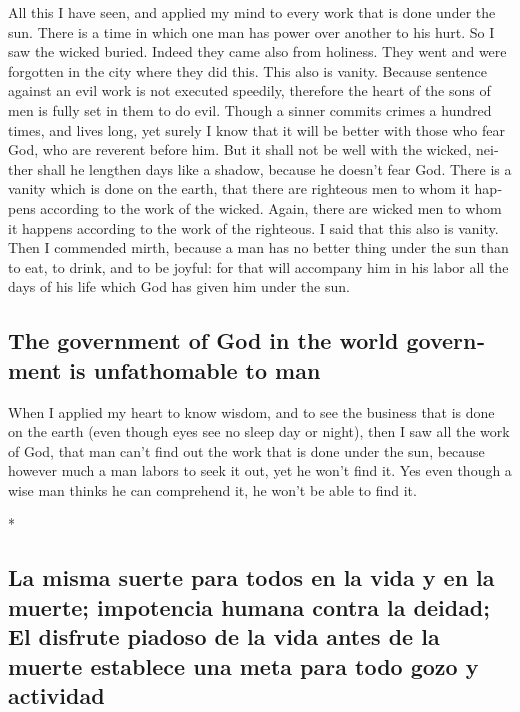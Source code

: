 \begin{paracol}{2}
\begin{otherlanguage}{english}
 All this I have seen, and applied my mind to every work
that is done under the sun. There is a time in which one man has power
over another to his hurt.  So I saw the wicked buried.
Indeed they came also from holiness. They went and were forgotten in the
city where they did this. This also is vanity.  Because
sentence against an evil work is not executed speedily, therefore the
heart of the sons of men is fully set in them to do evil.
 Though a sinner commits crimes a hundred times, and
lives long, yet surely I know that it will be better with those who fear
God, who are reverent before him.  But it shall not be
well with the wicked, neither shall he lengthen days like a shadow,
because he doesn't fear God.  There is a vanity which is
done on the earth, that there are righteous men to whom it happens
according to the work of the wicked. Again, there are wicked men to whom
it happens according to the work of the righteous. I said that this also
is vanity.  Then I commended mirth, because a man has no
better thing under the sun than to eat, to drink, and to be joyful: for
that will accompany him in his labor all the days of his life which God
has given him under the sun.

\hypertarget{the-government-of-god-in-the-world-government-is-unfathomable-to-man}{%
\subsection{The government of God in the world government is
unfathomable to
man}\label{the-government-of-god-in-the-world-government-is-unfathomable-to-man}}

 When I applied my heart to know wisdom, and to see the
business that is done on the earth (even though eyes see no sleep day or
night),  then I saw all the work of God, that man can't
find out the work that is done under the sun, because however much a man
labors to seek it out, yet he won't find it. Yes even though a wise man
thinks he can comprehend it, he won't be able to find it.

\end{otherlanguage}

\switchcolumn[0]*

\hypertarget{la-misma-suerte-para-todos-en-la-vida-y-en-la-muerte-impotencia-humana-contra-la-deidad-el-disfrute-piadoso-de-la-vida-antes-de-la-muerte-establece-una-meta-para-todo-gozo-y-actividad}{%
\subsection{La misma suerte para todos en la vida y en la muerte;
impotencia humana contra la deidad; El disfrute piadoso de la vida antes
de la muerte establece una meta para todo gozo y
actividad}\label{la-misma-suerte-para-todos-en-la-vida-y-en-la-muerte-impotencia-humana-contra-la-deidad-el-disfrute-piadoso-de-la-vida-antes-de-la-muerte-establece-una-meta-para-todo-gozo-y-actividad}}


\end{paracol}
